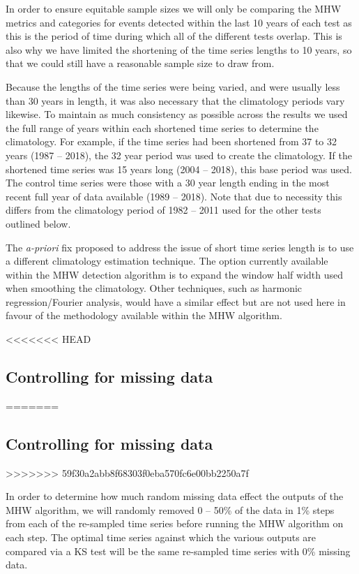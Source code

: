 \documentclass[]{article}
\begin{document}
{In order to ensure equitable sample sizes we will only be comparing the
MHW metrics and categories for events detected within the last 10 years
of each test as this is the period of time during which all of the
different tests overlap. This is also why we have limited the shortening
of the time series lengths to 10 years, so that we could still have a
reasonable sample size to draw from.

Because the lengths of the time series were being varied, and were
usually less than 30 years in length, it was also necessary that the
climatology periods vary likewise. To maintain as much consistency as
possible across the results we used the full range of years within each
shortened time series to determine the climatology. For example, if the
time series had been shortened from 37 to 32 years (1987 -- 2018), the
32 year period was used to create the climatology. If the shortened time
series was 15 years long (2004 -- 2018), this base period was used. The
control time series were those with a 30 year length ending in the most
recent full year of data available (1989 -- 2018). Note that due to
necessity this differs from the climatology period of 1982 -- 2011 used
for the other tests outlined below.

The \emph{a-priori} fix proposed to address the issue of short time
series length is to use a different climatology estimation technique.
The option currently available within the MHW detection algorithm is to
expand the window half width used when smoothing the climatology. Other
techniques, such as harmonic regression/Fourier analysis, would have a
similar effect but are not used here in favour of the methodology
available within the MHW algorithm.

<<<<<<< HEAD
\hypertarget{controlling-for-missing-data}{%
\subsection{Controlling for missing
data}\label{controlling-for-missing-data}}
=======
\subsection{Controlling for missing
data}\label{controlling-for-missing-data}
>>>>>>> 59f30a2abb8f68303f0eba570fc6e00bb2250a7f

In order to determine how much random missing data effect the outputs of
the MHW algorithm, we will randomly removed 0 -- 50\% of the data in 1\%
steps from each of the re-sampled time series before running the MHW
algorithm on each step. The optimal time series against which the
various outputs are compared via a KS test will be the same re-sampled
time series with 0\% missing data.

}
\end{document}
